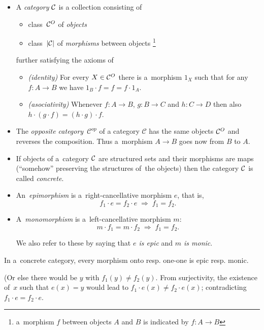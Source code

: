 \begin{itemize}
\item A \emph{category} $\mathcal{C}$ is a collection consisting of
  \begin{itemize}
  \item class~$\mathcal{C}^O$ of \emph{objects\/}
  \item class~$|\mathcal{C}|$ of \emph{morphisms\/} between objects\thinspace%
  \footnote{a~morphism $f$ between objects $A$ and $B$ is indicated by $f\colon
    A \to B$}
  \end{itemize}
further satisfying the axioms of
  \begin{itemize}
  \item \emph{(identity)\/}
  For every $X\in \mathcal{C}^O$ there is a~morphism $1_X$ such that for any $f\colon
  A \to B$ we have $1_B \cdot f = f = f \cdot 1_A$.
  \item \emph{(asociativity)\/}
  Whenever $f\colon A \to B$, $g\colon B \to C$ and $h\colon C \to D$ then also $h
  \cdot (g \cdot f) = (h \cdot g) \cdot f$.
  \end{itemize}

\item The \emph{opposite category}~$\mathcal{C}^{op}$ of a category
$\mathcal{C}$ has the same objects $\mathcal{C}^O$ and reverses the composition.
Thus a~morphism $A \to B$ goes now from $B$ to $A$.

\item If objects of a~category $\mathcal{C}$ are structured sets and their morphisms
are maps (``somehow'' preserving the structures of~the objects) then the
category $\mathcal{C}$ is called \emph{concrete\/}.

\item An~\emph{epimorphism} is a~right-cancellative morphism $e$, that is,
\[
  f_1 \cdot e = f_2 \cdot e \; \Longrightarrow \; f_1 = f_2.
\]

\item A~\emph{monomorphism} is a~left-cancellative morphism $m$:
\[
  m \cdot f_1 = m \cdot f_2 \; \Longrightarrow \; f_1 = f_2.
\]

We also refer to these by saying that \emph{$e$ is epic\/} and \emph{$m$ is
monic\/}.
\end{itemize}

\begin{fact} \label{fct:onto->epic}
  In a~concrete category, every morphism onto resp. one-one is epic resp.
  monic.
\end{fact}
(Or else there would be $y$ with $f_1(y) \ne f_2(y)$.
 From surjectivity, the existence of~$x$ such that $e(x) = y$ would lead to
 $f_1 \cdot e(x) \ne f_2 \cdot e(x)$; contradicting $f_1 \cdot e = f_2 \cdot
 e$.

